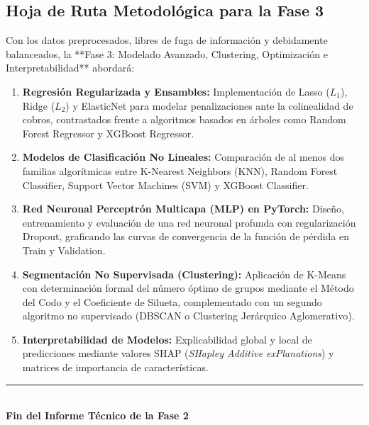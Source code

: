 \documentclass[11pt,letterpaper]{article}
\begin{document}
\subsection{Hoja de Ruta Metodológica para la Fase 3}
Con los datos preprocesados, libres de fuga de información y debidamente balanceados, la **Fase 3: Modelado Avanzado, Clustering, Optimización e Interpretabilidad** abordará:
\begin{enumerate}
    \item \textbf{Regresión Regularizada y Ensambles:} Implementación de Lasso ($L_1$), Ridge ($L_2$) y ElasticNet para modelar penalizaciones ante la colinealidad de cobros, contrastados frente a algoritmos basados en árboles como Random Forest Regressor y XGBoost Regressor.
    \item \textbf{Modelos de Clasificación No Lineales:} Comparación de al menos dos familias algorítmicas entre K-Nearest Neighbors (KNN), Random Forest Classifier, Support Vector Machines (SVM) y XGBoost Classifier.
    \item \textbf{Red Neuronal Perceptrón Multicapa (MLP) en PyTorch:} Diseño, entrenamiento y evaluación de una red neuronal profunda con regularización Dropout, graficando las curvas de convergencia de la función de pérdida en Train y Validation.
    \item \textbf{Segmentación No Supervisada (Clustering):} Aplicación de K-Means con determinación formal del número óptimo de grupos mediante el Método del Codo y el Coeficiente de Silueta, complementado con un segundo algoritmo no supervisado (DBSCAN o Clustering Jerárquico Aglomerativo).
    \item \textbf{Interpretabilidad de Modelos:} Explicabilidad global y local de predicciones mediante valores SHAP (\textit{SHapley Additive exPlanations}) y matrices de importancia de características.
\end{enumerate}

\vspace{0.8cm}
\begin{center}
    \rule{0.6\linewidth}{0.6pt}\\
    \small \textbf{Fin del Informe Técnico de la Fase 2}
\end{center}
\end{document}
